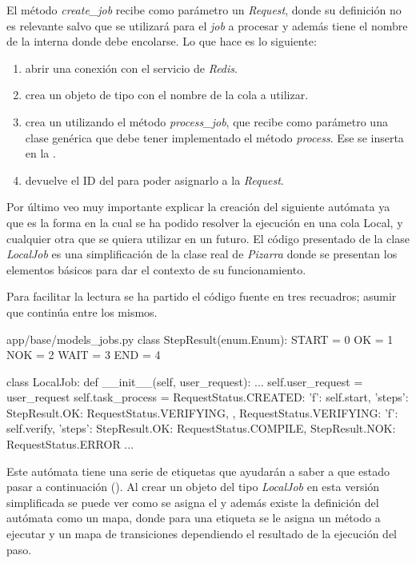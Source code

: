 \documentclass[11pt,spanish,listoffigures,listoftables]{tfgetsinf}
\begin{document}
El método \textit{create\_job} recibe como parámetro un \textit{Request}, donde su definición no es relevante salvo que se utilizará para el \textit{job} a procesar y además tiene el nombre de la  interna donde debe encolarse. Lo que hace es lo siguiente:

\begin{enumerate}
	\item abrir una conexión con el servicio de \textit{Redis}.
	\item crea un objeto de tipo  con el nombre de la \gls{cola} a utilizar.
	\item crea un  utilizando el método \textit{process\_job}, que recibe como parámetro una clase genérica que debe tener implementado el método \textit{process}. Ese  se inserta en la .
	\item devuelve el ID del  para poder asignarlo a la \textit{Request}.
\end{enumerate}

Por último veo muy importante explicar la creación del siguiente autómata ya que es la forma en la cual se ha podido resolver la ejecución en una \gls{cola} Local, \kahan y cualquier otra que se quiera utilizar en un futuro. El código presentado de la clase \textit{LocalJob} es una simplificación de la clase real de \textit{Pizarra} donde se presentan los elementos básicos para dar el contexto de su funcionamiento.

Para facilitar la lectura se ha partido el código fuente en tres recuadros; asumir que continúa entre los mismos.

\begin{code}{app/base/models\_jobs.py}
class StepResult(enum.Enum):
	START = 0
	OK = 1
	NOK = 2
	WAIT = 3
	END = 4
	
class LocalJob:
	def __init__(self, user_request):
		...
		self.user_request = user_request
		self.task_process = {
			RequestStatus.CREATED: {
				'f': self.start,
				'steps': {
					StepResult.OK: RequestStatus.VERIFYING,
				}
			},
			RequestStatus.VERIFYING: {
				'f': self.verify,
				'steps': {
					StepResult.OK: RequestStatus.COMPILE,
					StepResult.NOK: RequestStatus.ERROR
				}
			}
			...
		}
	
\end{code}

Este autómata tiene una serie de etiquetas que ayudarán a saber a que estado pasar a continuación (). Al crear un objeto del tipo \textit{LocalJob} en esta versión simplificada se puede ver como se asigna el  y además existe la definición del autómata como un mapa, donde para una etiqueta se le asigna un método a ejecutar y un mapa de transiciones dependiendo el resultado de la ejecución del paso. \newline
	
\end{document}
